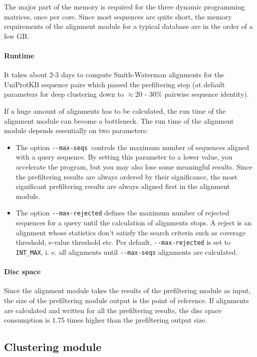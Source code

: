 \documentclass[11pt,a4paper]{report}
\begin{document}
The major part of the memory is required for the three dynamic programming
matrices, once per core. Since most sequences are quite short, the
memory requirements of the alignment module for a typical database
are in the order of a few GB. 


\paragraph{Runtime}

It takes about 2-3 days to compute Smith-Waterman alignments for the
UniProtKB sequence pairs which passed the prefiltering step (at default
parameters for deep clustering down to $\approx$20 - 30\% pairwise
sequence identity).

If a huge amount of alignments has to be calculated, the run time
of the alignment module can become a bottleneck. The run time of the
alignment module depends essentially on two parameters:
\begin{itemize}
\item The option \texttt{-{}-max-seqs }controls the maximum number of sequences
aligned with a query sequence. By setting this parameter to a lower
value, you accelerate the program, but you may also lose some meaningful
results. Since the prefiltering results are always ordered by their
significance, the most significant prefiltering results are always
aligned first in the alignment module.
\item The option \texttt{-{}-max-rejected} defines the maximum number of
rejected sequences for a query until the calculation of alignments
stops. A reject is an alignment whose statistics don't satisfy the
search criteria such as coverage threshold, e-value threshold etc.
Per default, \texttt{-{}-max-rejected} is set to \texttt{INT\_MAX},
i. e. all alignments until \texttt{-{}-max-seqs} alignments are calculated.
\end{itemize}

\paragraph{Disc space}

Since the alignment module takes the results of the prefiltering module
as input, the size of the prefiltering module output is the point
of reference. If alignments are calculated and written for all the
prefiltering results, the disc space consumption is $1.75$ times
higher than the prefiltering output size.


\subsection{Clustering module}
\end{document}
